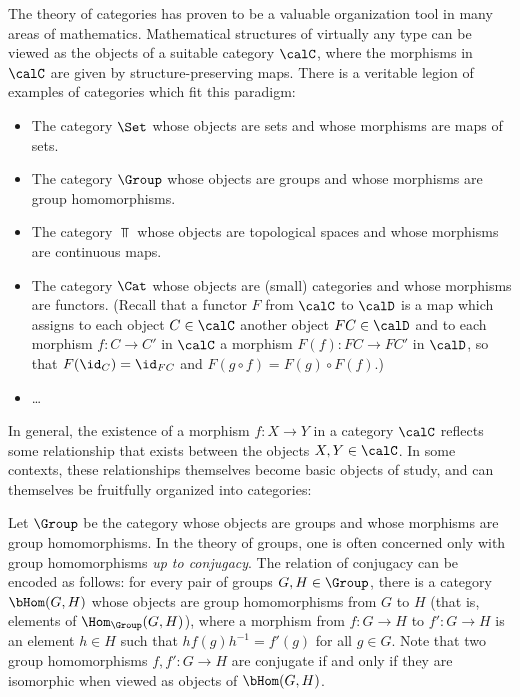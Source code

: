 The theory of categories has proven to be a valuable organization tool in many areas of mathematics. Mathematical structures of virtually any type can be viewed as the objects of a suitable category $\calC$, where the morphisms in $\calC$ are given by structure-preserving maps. There is a veritable legion of examples of categories which fit this paradigm:
\begin{itemize}
\item The category $\Set$ whose objects are sets and whose morphisms are maps of sets.
\item The category $\Group$ whose objects are groups and whose morphisms are group homomorphisms.
\item The category $\Top$ whose objects are topological spaces and whose morphisms are continuous maps.
\item The category $\Cat$ whose objects are (small) categories and whose morphisms
are functors. (Recall that a functor $F$ from $\calC$ to $\calD$ is a map which assigns to each object
$C \in \calC$ another object $FC \in \calD$ and to each morphism $f: C \rightarrow C'$ in
$\calC$ a morphism $F(f): FC \rightarrow FC'$ in $\calD$, so that $F( \id_C) = \id_{FC}$ and
$F(g \circ f) = F(g) \circ F(f)$.)
\item \ldots
\end{itemize}

In general, the existence of a morphism $f: X \rightarrow Y$ in a category $\calC$ reflects some relationship that exists between the objects $X,Y \in \calC$. In some contexts, these relationships themselves become basic objects of study, and can themselves be fruitfully organized into categories:

\begin{example}\label{2cat1}
Let $\Group$ be the category whose objects are groups and whose morphisms are group homomorphisms. In the theory of groups, one is often concerned only with group homomorphisms
{\em up to conjugacy}. The relation of conjugacy can be encoded as follows: for every pair of
groups $G, H \in \Group$, there is a category $\bHom(G,H)$ whose objects are group homomorphisms
from $G$ to $H$ (that is, elements of $\Hom_{\Group}(G,H)$), where a morphism from $f: G \rightarrow H$ to $f': G \rightarrow H$ is an element $h \in H$ such that $h f(g) h^{-1} = f'(g)$ for all $g \in G$.
Note that two group homomorphisms $f,f': G \rightarrow H$ are conjugate if and only if they are isomorphic when viewed as objects of $\bHom(G,H)$.
\end{example}

